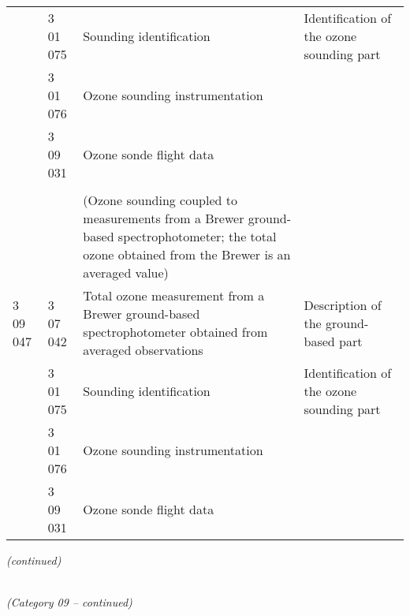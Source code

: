 \begin{longtable}[]{@{}llll@{}}
& 3 01 075 & Sounding identification & Identification of the ozone sounding part\tabularnewline
& 3 01 076 & Ozone sounding instrumentation &\tabularnewline
& 3 09 031 & Ozone sonde flight data &\tabularnewline
& & &\tabularnewline
& & (Ozone sounding coupled to measurements from a Brewer ground-based spectrophotometer; the total ozone obtained from the Brewer is an averaged value) &\tabularnewline
3 09 047 & 3 07 042 & Total ozone measurement from a Brewer ground-based spectrophotometer obtained from averaged observations & Description of the ground-based part\tabularnewline
& 3 01 075 & Sounding identification & Identification of the ozone sounding part\tabularnewline
& 3 01 076 & Ozone sounding instrumentation &\tabularnewline
& 3 09 031 & Ozone sonde flight data &\tabularnewline
\bottomrule
\end{longtable}

\emph{(continued)}

\emph{\\
(Category 09 -- continued)}

